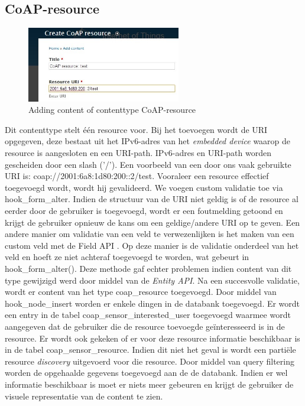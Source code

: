\subsection{CoAP-resource}
\begin{figure}
\vspace{-10pt}
\centering
\label{fig:addCoapResource}
\includegraphics[width=0.6\textwidth]{fig/add_coap_resource}
\vspace{-20pt}
\centering
\caption{Adding content of contenttype CoAP-resource}
\centering
\vspace{-10pt}
\end{figure}
Dit contenttype stelt \'{e}\'{e}n resource voor. Bij het toevoegen wordt de URI opgegeven, deze bestaat uit het IPv6-adres van het \textit{embedded device} waarop de resource is aangesloten en een URI-path. IPv6-adres en URI-path worden gescheiden door een slash ('/'). Een voorbeeld van een door ons vaak gebruikte URI is: coap://2001:6a8:1d80:200::2/test. Vooraleer een resource effectief toegevoegd wordt, wordt hij gevalideerd. We voegen custom validatie toe via hook\_form\_alter. Indien de structuur van de URI niet geldig is of de resource al eerder door de gebruiker is toegevoegd, wordt er een foutmelding getoond en krijgt de gebruiker opnieuw de kans om een geldige/andere URI op te geven. Een andere manier om validatie van een veld te verwezenlijken is het maken van een custom veld met de Field API \cite{fieldAPI}. Op deze manier is de validatie onderdeel van het veld en hoeft ze niet achteraf toegevoegd te worden, wat gebeurt in hook\_form\_alter(). Deze methode gaf echter problemen indien content van dit type gewijzigd werd door middel van de \textit{Entity API}. Na een succesvolle validatie, wordt er content van het type coap\_resource toegevoegd. Door middel van hook\_node\_insert worden er enkele dingen in de databank toegevoegd. Er wordt een entry in de tabel coap\_sensor\_interested\_user toegevoegd waarmee wordt aangegeven dat de gebruiker die de resource toevoegde ge\"{i}nteresseerd is in de resource. Er wordt ook gekeken of er voor deze resource informatie beschikbaar is in de tabel coap\_sensor\_resource. Indien dit niet het geval is wordt een parti\"{e}le resource \textit{discovery} uitgevoerd voor die resource. Door middel van query filtering worden de opgehaalde gegevens toegevoegd aan de de databank. Indien er wel informatie beschikbaar is moet er niets meer gebeuren en krijgt de gebruiker de visuele representatie van de content te zien.\\

